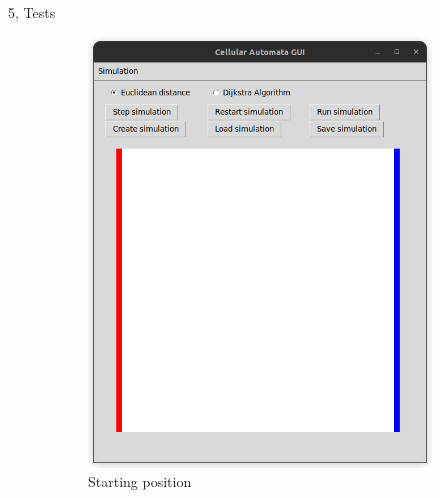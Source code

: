 \documentclass[10pt,a4paper]{article}
\begin{document}
\begin{task}{5, Tests}
\begin{figure}[H]
     \centering
     \begin{subfigure}[b]{0.3\textwidth}
         \centering
         \includegraphics[width=\textwidth]{images/scenario7_initial.png}
         \caption{Starting position}
         \label{fig:rimea7a}
     \end{subfigure}
     \begin{subfigure}[b]{0.3\textwidth}
         \centering

\end{subfigure}
\end{figure}
\end{task}
\end{document}
